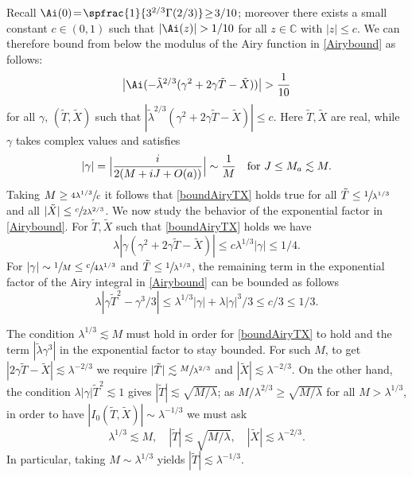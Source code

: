 Recall $\Ai(0)\!=\!\spfrac{1}{3^{2/3}\Gamma(2/3)}\!\geq\!3/10$; moreover there exists a small constant $c\!\in\!(0,1)$ such that $|\Ai(z)|>1/10$ for all $z\in\mathbb{C}$ with $|z|\leq c$. We can therefore bound from below the modulus of the Airy function in \eqref{Airybound} as follows:
\begin{equation}\label{boundAiryTX}
\bigl|\Ai(-\tilde\lambda^{2/3}(\gamma^2+2\gamma \tilde T-\tilde X))\bigr|>\frac 1 {10}
\end{equation}
for all $\gamma$, $(\tilde T,\tilde X)$ such that $|\tilde\lambda^{2/3}(\gamma^2+2\gamma \tilde T-\tilde X)|\leq c$. Here $\tilde T,\tilde X$ are real, while $\gamma$ takes complex values and satisfies
\[
|\gamma|= \Bigl |\frac{i}{2(M+iJ+O(a))}\Bigr|\sim \frac{1}{M}\quad\text{for }J\leq M_a\lesssim M.
\]
Taking $M\geq \sfrac{4\lambda^{1/3}}{c}$ it follows that \eqref{boundAiryTX} holds true for all $\tilde T\leq \sfrac{1}{\lambda^{1/3}}$ and all $|\tilde X|\leq \sfrac{c}{2\lambda^{2/3}}$.
We now study the behavior of the exponential factor in \eqref{Airybound}. For $\tilde T,\tilde X$ such that \eqref{boundAiryTX} holds we have
\[
\lambda |\gamma(\gamma^2+2\gamma \tilde T-\tilde X)|\leq c\lambda^{1/3}|\gamma|\leq 1/4.
\]
For $|\gamma|\sim \sfrac{1}{M}\leq \sfrac{c}{4\lambda^{1/3}}$ and $\tilde T\leq \sfrac{1}{\lambda^{1/3}}$, the remaining term in the exponential factor of the Airy integral in \eqref{Airybound} can be bounded as follows
\begin{equation}\label{condT}
\lambda |\gamma \tilde T^2-\gamma^3/3|\leq \lambda^{1/3}|\gamma|+\lambda |\gamma|^3/3\leq c/3\leq 1/3.
\end{equation}
\begin{rmq}
The condition $\lambda^{1/3}\lesssim M$ must hold in order for \eqref{boundAiryTX} to hold and the term $|\tilde\lambda\gamma^3|$ in the exponential factor to stay bounded. For such $M$, to get $|2\gamma \tilde T-\tilde X|\lesssim \lambda^{-2/3}$ we require $|\tilde T|\lesssim \sfrac{M}{\lambda^{2/3}}$ and $|\tilde X |\lesssim \lambda^{-2/3}$. On the other hand, the condition $\lambda |\gamma|\tilde T^2\lesssim 1$ gives $|\tilde T|\lesssim \sqrt{M/\lambda}$; as $M/\lambda^{2/3}\geq \sqrt{M/\lambda}$ for all $M>\lambda^{1/3}$, in order to have $|I_0(\tilde T,\tilde X)|\sim \lambda^{-1/3}$ we must ask
\begin{equation}\label{condTX}
\lambda^{1/3}\lesssim M,\quad |\tilde T|\lesssim \sqrt{M/\lambda}, \quad |\tilde X|\lesssim \lambda^{-2/3}.
\end{equation}
In particular, taking $M\sim \lambda^{1/3}$ yields $|\tilde T|\lesssim \lambda^{-1/3}$.
\end{rmq}
